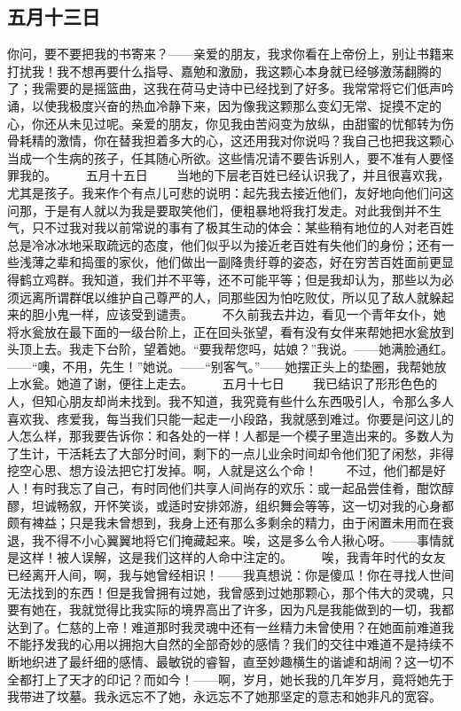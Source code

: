 \documentclass[11pt,oneside]{book}
\begin{document}
\begin{common-format}
\section{五月十三日}
你问，要不要把我的书寄来？——亲爱的朋友，我求你看在上帝份上，别让书籍来打扰我！我不想再要什么指导、嘉勉和激励，我这颗心本身就已经够激荡翻腾的了；我需要的是摇篮曲，这我在荷马史诗中已经找到了好多。我常常将它们低声吟诵，以使我极度兴奋的热血冷静下来，因为像我这颗那么变幻无常、捉摸不定的心，你还从未见过呢。亲爱的朋友，你见我由苦闷变为放纵，由甜蜜的忧郁转为伤骨耗精的激情，你在替我担着多大的心，这还用我对你说吗？我自己也把我这颗心当成一个生病的孩子，任其随心所欲。这些情况请不要告诉别人，要不准有人要怪罪我的。
　　五月十五日
　　当地的下层老百姓已经认识我了，并且很喜欢我，尤其是孩子。我来作个有点儿可悲的说明：起先我去接近他们，友好地向他们问这问那，于是有人就以为我是要取笑他们，便粗暴地将我打发走。对此我倒并不生气，只不过我对我以前常说的事有了极其生动的体会：某些稍有地位的人对老百姓总是冷冰冰地采取疏远的态度，他们似乎以为接近老百姓有失他们的身份；还有一些浅薄之辈和捣蛋的家伙，他们做出一副降贵纡尊的姿态，好在穷苦百姓面前更显得鹤立鸡群。我知道，我们并不平等，还不可能平等；但是我却认为，那些以为必须远离所谓群氓以维护自己尊严的人，同那些因为怕吃败仗，所以见了敌人就躲起来的胆小鬼一样，应该受到谴责。
　　不久前我去井边，看见一个青年女仆，她将水瓮放在最下面的一级台阶上，正在回头张望，看有没有女伴来帮她把水瓮放到头顶上去。我走下台阶，望着她。“要我帮您吗，姑娘？”我说。——她满脸通红。——“噢，不用，先生！”她说。——“别客气。”——她摆正头上的垫圈，我帮她放上水瓮。她道了谢，便往上走去。
　　五月十七日
　　我已结识了形形色色的人，但知心朋友却尚未找到。我不知道，我究竟有些什么东西吸引人，令那么多人喜欢我、疼爱我，每当我们只能一起走一小段路，我就感到难过。你要是问这儿的人怎么样，那我要告诉你：和各处的一样！人都是一个模子里造出来的。多数人为了生计，干活耗去了大部分时间，剩下的一点儿业余时间却令他们犯了闲愁，非得挖空心思、想方设法把它打发掉。啊，人就是这么个命！
　　不过，他们都是好人！有时我忘了自己，有时同他们共享人间尚存的欢乐：或一起品尝佳肴，酣饮醇醪，坦诚畅叙，开怀笑谈，或适时安排郊游，组织舞会等等，这一切对我的心身都颇有裨益；只是我未曾想到，我身上还有那么多剩余的精力，由于闲置未用而在衰退，我不得不小心翼翼地将它们掩藏起来。唉，这是多么令人揪心呀。——事情就是这样！被人误解，这是我们这样的人命中注定的。
　　唉，我青年时代的女友已经离开人间，啊，我与她曾经相识！——我真想说：你是傻瓜！你在寻找人世间无法找到的东西！但是我曾拥有过她，我曾感到过她那颗心，那个伟大的灵魂，只要有她在，我就觉得比我实际的境界高出了许多，因为凡是我能做到的一切，我都达到了。仁慈的上帝！难道那时我灵魂中还有一丝精力未曾使用？在她面前难道我不能抒发我的心用以拥抱大自然的全部奇妙的感情？我们的交往中难道不是持续不断地织进了最纤细的感情、最敏锐的睿智，直至妙趣横生的谐谑和胡闹？这一切不全都打上了天才的印记？而如今！——啊，岁月，她长我的几年岁月，竟将她先于我带进了坟墓。我永远忘不了她，永远忘不了她那坚定的意志和她非凡的宽容。

\end{common-format}
\end{document}
